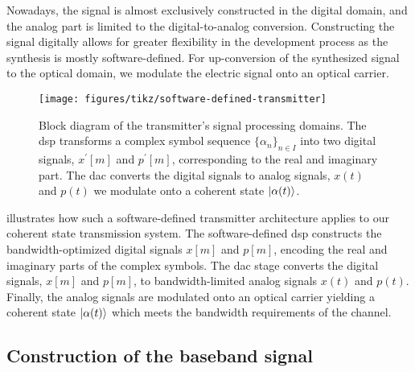 Nowadays, the signal is almost exclusively constructed in the digital domain, and the analog part is limited to the digital-to-analog conversion.
Constructing the signal digitally allows for greater flexibility in the development process as the synthesis is mostly software-defined.
For up-conversion of the synthesized signal to the optical domain, we modulate the electric signal onto an optical carrier.
\begin{figure}[htb]
	\centering
	\texttt{[image: figures/tikz/software-defined-transmitter]}
	\caption{Block diagram of the transmitter's signal processing domains. The \gls{dsp} transforms a complex symbol sequence $\{\alpha_n\}_{n\in I}$ into two digital signals, $x^\prime[m]$ and $p^\prime[m]$, corresponding to the real and imaginary part. The \gls{dac} converts the digital signals to analog signals, $x(t)$ and $p(t)$ we modulate onto a coherent state $\lvert\alpha(t)\rangle$.}\label{fig:software_defined_transmitter}
\end{figure}
 illustrates how such a software-defined transmitter architecture applies to our coherent state transmission system.
The software-defined \gls{dsp} constructs the bandwidth-optimized digital signals $x[m]$ and $p[m]$, encoding the real and imaginary parts of the complex symbols.
The \gls{dac} stage converts the digital signals, $x[m]$ and $p[m]$, to bandwidth-limited analog signals $x(t)$ and $p(t)$.
Finally, the analog signals are modulated onto an optical carrier yielding a coherent state $\lvert\alpha(t)\rangle$ which meets the bandwidth requirements of the channel.

\subsection{Construction of the baseband signal}

